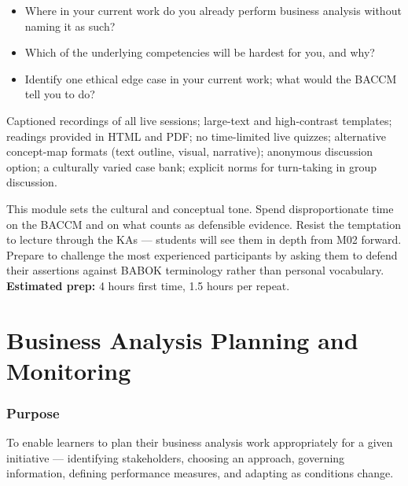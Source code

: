 \documentclass[11pt,letterpaper,oneside]{report}
\begin{document}
\begin{curriculumreflection}
\begin{itemize}
  \item Where in your current work do you already perform business analysis without naming it as such?
  \item Which of the underlying competencies will be hardest for you, and why?
  \item Identify one ethical edge case in your current work; what would the BACCM tell you to do?
\end{itemize}
\end{curriculumreflection}

\begin{curriculumnote}
Captioned recordings of all live sessions; large-text and high-contrast templates; readings provided in HTML and PDF; no time-limited live quizzes; alternative concept-map formats (text outline, visual, narrative); anonymous discussion option; a culturally varied case bank; explicit norms for turn-taking in group discussion.
\end{curriculumnote}

\begin{curriculumteachingnotes}
This module sets the cultural and conceptual tone. Spend disproportionate time on the BACCM and on what counts as defensible evidence. Resist the temptation to lecture through the KAs --- students will see them in depth from M02 forward. Prepare to challenge the most experienced participants by asking them to defend their assertions against BABOK terminology rather than personal vocabulary. \textbf{Estimated prep:} 4 hours first time, 1.5 hours per repeat.
\end{curriculumteachingnotes}

\chapter{Business Analysis Planning and Monitoring}

\subsection*{Purpose}
To enable learners to plan their business analysis work appropriately for a given initiative --- identifying stakeholders, choosing an approach, governing information, defining performance measures, and adapting as conditions change.
\end{document}
